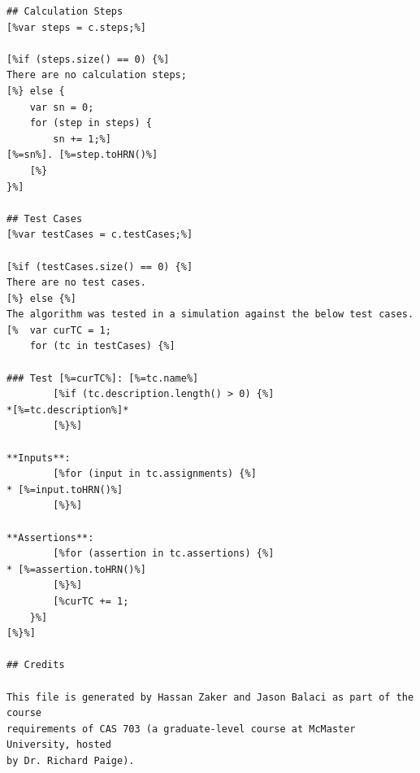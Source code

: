 \documentclass[11pt,fleqn]{article}
\begin{document}
\begin{lstlisting}[caption={README Generation EGL},label={lst:readme-generation-egl}]
## Calculation Steps
[%var steps = c.steps;%]

[%if (steps.size() == 0) {%]
There are no calculation steps;
[%} else {
    var sn = 0;
    for (step in steps) {
        sn += 1;%]
[%=sn%]. [%=step.toHRN()%]
    [%}
}%]

## Test Cases
[%var testCases = c.testCases;%]

[%if (testCases.size() == 0) {%]
There are no test cases.
[%} else {%]
The algorithm was tested in a simulation against the below test cases.
[%  var curTC = 1;
    for (tc in testCases) {%]

### Test [%=curTC%]: [%=tc.name%]
        [%if (tc.description.length() > 0) {%]
*[%=tc.description%]*
        [%}%]

**Inputs**:
        [%for (input in tc.assignments) {%]
* [%=input.toHRN()%]
        [%}%]

**Assertions**:
        [%for (assertion in tc.assertions) {%]
* [%=assertion.toHRN()%]
        [%}%]
        [%curTC += 1;
    }%]
[%}%]

## Credits

This file is generated by Hassan Zaker and Jason Balaci as part of the course
requirements of CAS 703 (a graduate-level course at McMaster University, hosted
by Dr. Richard Paige).
\end{lstlisting}
\end{document}
